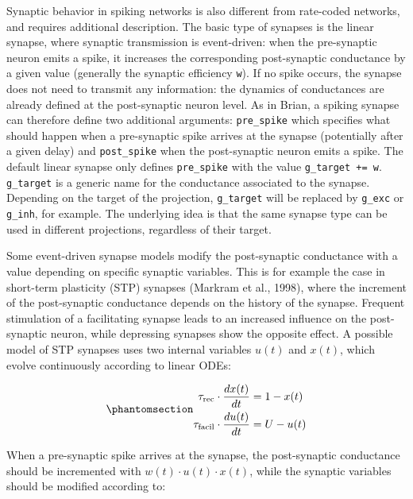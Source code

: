 \documentclass[
  11pt,
  a4paper,
]{scrbook}
\begin{document}
Synaptic behavior in spiking networks is also different from rate-coded
networks, and requires additional description. The basic type of
synapses is the linear synapse, where synaptic transmission is
event-driven: when the pre-synaptic neuron emits a spike, it increases
the corresponding post-synaptic conductance by a given value (generally
the synaptic efficiency \texttt{w}). If no spike occurs, the synapse
does not need to transmit any information: the dynamics of conductances
are already defined at the post-synaptic neuron level. As in Brian, a
spiking synapse can therefore define two additional arguments:
\texttt{pre\_spike} which specifies what should happen when a
pre-synaptic spike arrives at the synapse (potentially after a given
delay) and \texttt{post\_spike} when the post-synaptic neuron emits a
spike. The default linear synapse only defines \texttt{pre\_spike} with
the value \texttt{g\_target\ +=\ w}. \texttt{g\_target} is a generic
name for the conductance associated to the synapse. Depending on the
target of the projection, \texttt{g\_target} will be replaced by
\texttt{g\_exc} or \texttt{g\_inh}, for example. The underlying idea is
that the same synapse type can be used in different projections,
regardless of their target.

Some event-driven synapse models modify the post-synaptic conductance
with a value depending on specific synaptic variables. This is for
example the case in short-term plasticity (STP) synapses (Markram et
al., 1998), where the increment of the post-synaptic conductance depends
on the history of the synapse. Frequent stimulation of a facilitating
synapse leads to an increased influence on the post-synaptic neuron,
while depressing synapses show the opposite effect. A possible model of
STP synapses uses two internal variables \(u(t)\) and \(x(t)\), which
evolve continuously according to linear ODEs:

\begin{equation}\phantomsection\label{eq-fini:stp}{
\begin{aligned}
\tau_\text{rec} \cdot \frac{dx(t)}{dt} &= 1 - x(t) \\
\tau_\text{facil} \cdot \frac{du(t)}{dt} &= U - u(t) \\
\end{aligned}
}\end{equation}

When a pre-synaptic spike arrives at the synapse, the post-synaptic
conductance should be incremented with \(w(t) \cdot u(t) \cdot x(t)\),
while the synaptic variables should be modified according to:
\end{document}
